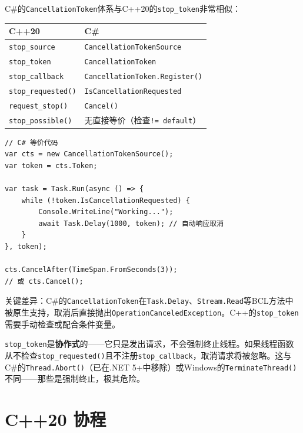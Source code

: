 \documentclass[12pt,a4paper,fontset=fandol]{ctexbook}
\newcommand{\cpp}[1]{C++#1}
\newcommand{\csharp}{C\#}
\begin{document}
\begin{compare}
\csharp{}的\texttt{CancellationToken}体系与\cpp{}20的\texttt{stop\_token}非常相似：

\begin{longtable}{ll}
\toprule
\textbf{\cpp{}20} & \textbf{\csharp{}} \\
\midrule
\texttt{stop\_source} & \texttt{CancellationTokenSource} \\
\texttt{stop\_token} & \texttt{CancellationToken} \\
\texttt{stop\_callback} & \texttt{CancellationToken.Register()} \\
\texttt{stop\_requested()} & \texttt{IsCancellationRequested} \\
\texttt{request\_stop()} & \texttt{Cancel()} \\
\texttt{stop\_possible()} & 无直接等价（检查\texttt{!= default}） \\
\bottomrule
\end{longtable}

\begin{lstlisting}[style=csharpstyle]
// C# 等价代码
var cts = new CancellationTokenSource();
var token = cts.Token;

var task = Task.Run(async () => {
    while (!token.IsCancellationRequested) {
        Console.WriteLine("Working...");
        await Task.Delay(1000, token); // 自动响应取消
    }
}, token);

cts.CancelAfter(TimeSpan.FromSeconds(3));
// 或 cts.Cancel();
\end{lstlisting}

关键差异：\csharp{}的\texttt{CancellationToken}在\texttt{Task.Delay}、\texttt{Stream.Read}等BCL方法中被原生支持，取消后直接抛出\texttt{OperationCanceledException}。\cpp{}的\texttt{stop\_token}需要手动检查或配合条件变量。
\end{compare}

\begin{warning}
\texttt{stop\_token}是\textbf{协作式}的——它只是发出请求，不会强制终止线程。如果线程函数从不检查\texttt{stop\_requested()}且不注册\texttt{stop\_callback}，取消请求将被忽略。这与\csharp{}的\texttt{Thread.Abort()}（已在.NET 5+中移除）或Windows的\texttt{TerminateThread()}不同——那些是强制终止，极其危险。
\end{warning}

\part{\cpp{}20 协程}
\end{document}
